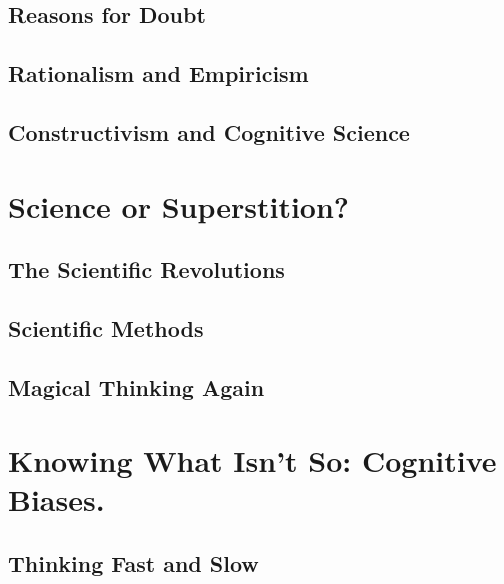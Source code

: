 \documentclass[
  12pt, openany]{book}
\begin{document}
\hypertarget{reasons-for-doubt}{%
\subsection{Reasons for Doubt}\label{reasons-for-doubt}}

\hypertarget{rationalism-and-empiricism}{%
\subsection{Rationalism and Empiricism}\label{rationalism-and-empiricism}}

\hypertarget{constructivism-and-cognitive-science}{%
\subsection{Constructivism and Cognitive Science}\label{constructivism-and-cognitive-science}}

\hypertarget{science-or-superstition}{%
\section{Science or Superstition?}\label{science-or-superstition}}

\hypertarget{the-scientific-revolutions}{%
\subsection{The Scientific Revolutions}\label{the-scientific-revolutions}}

\hypertarget{scientific-methods}{%
\subsection{Scientific Methods}\label{scientific-methods}}

\hypertarget{magical-thinking-again}{%
\subsection{Magical Thinking Again}\label{magical-thinking-again}}

\hypertarget{knowing-what-isnt-so-cognitive-biases.}{%
\section{Knowing What Isn't So: Cognitive Biases.}\label{knowing-what-isnt-so-cognitive-biases.}}

\hypertarget{thinking-fast-and-slow}{%
\subsection{Thinking Fast and Slow}\label{thinking-fast-and-slow}}
\end{document}
